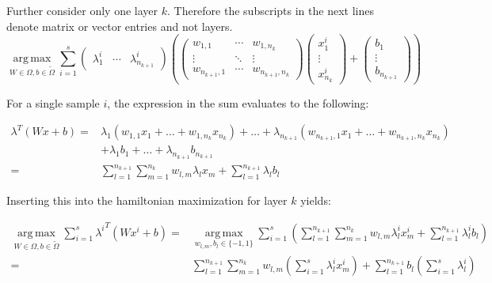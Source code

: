\documentclass[a4paper, 12pt]{scrreprt} %
\DeclareMathOperator*{\argmax}{arg\,max}
\begin{document}
Further consider only one layer $k$. Therefore the subscripts in the next lines denote matrix or vector entries and not layers.
\begin{equation*}
\underset{W\in \Omega, b \in \tilde\Omega}{\argmax} \sum_{i=1}^s \begin{pmatrix}
	\lambda^i_1 & \cdots & \lambda^i_{n_{k+1}}
\end{pmatrix} \left( \begin{pmatrix}
	w_{1,1} 					& \cdots & w_{1,n_{k}} \\
	\vdots  					& \ddots & \vdots \\
	w_{n_{k+1},1} & \cdots & w_{n_{k+1},n_{k}}
\end{pmatrix} \begin{pmatrix}
	x^i_1 \\
	\vdots \\
	x^i_{n_{k}}
\end{pmatrix} + \begin{pmatrix}
	b_1 \\
	\vdots \\
	b_{n_{k+1}}
\end{pmatrix}
\right)
\end{equation*}

For a single sample $i$, the expression in the sum evaluates to the following:

\begin{align*}
\lambda^T (W x +b) =& \lambda_1 (w_{1,1} x_1 + \dots + w_{1,n_k} x_{n_k}) + \dots + \lambda_{n_{k+1}} (w_{n_{k+1},1} x_1 + \dots + w_{n_{k+1},n_k} x_{n_k}) \\
& + \lambda_1 b_1+ \dots + \lambda_{n_{k+1}} b_{n_{k+1}} \\
 =& \sum_{l=1}^{n_{k+1}} \sum_{m=1}^{n_{k}} {w_{l,m} \lambda_l x_m} + \sum_{l=1}^{n_{k+1}} {\lambda_l b_l}
\end{align*}

Inserting this into the hamiltonian maximization for layer $k$ yields:

\begin{align}
\underset{W\in \Omega, b \in \tilde\Omega}{\argmax} \sum_{i=1}^s{{\lambda^{i}}^T (W x^{i} + b)} =& \underset{w_{l,m}, b_l \in \{-1,1\}}{\argmax} \sum_{i=1}^s \left( \sum_{l=1}^{n_{k+1}} \sum_{m=1}^{n_{k}} {w_{l,m} \lambda^i_l x^i_m} + \sum_{l=1}^{n_{k+1}} {\lambda^i_l b_l} \right) \\
 =& \sum_{l=1}^{n_{k+1}} \sum_{m=1}^{n_{k}} w_{l,m} \left( \sum_{i=1}^s \lambda^i_l x^i_m \right) + \sum_{l=1}^{n_{k+1}} b_l \left( \sum_{i=1}^s \lambda^i_l \right)
\end{align}
\end{document}
